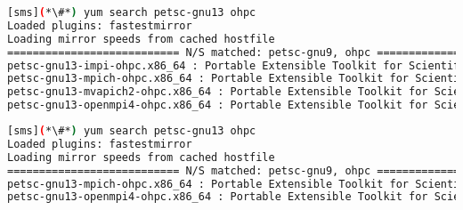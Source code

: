 \begin{lstlisting}[language=bash,keywords={}]
[sms](*\#*) yum search petsc-gnu13 ohpc
Loaded plugins: fastestmirror
Loading mirror speeds from cached hostfile
=========================== N/S matched: petsc-gnu9, ohpc ===========================
petsc-gnu13-impi-ohpc.x86_64 : Portable Extensible Toolkit for Scientific Computation
petsc-gnu13-mpich-ohpc.x86_64 : Portable Extensible Toolkit for Scientific Computation
petsc-gnu13-mvapich2-ohpc.x86_64 : Portable Extensible Toolkit for Scientific Computation
petsc-gnu13-openmpi4-ohpc.x86_64 : Portable Extensible Toolkit for Scientific Computation
\end{lstlisting}
\fi

\begin{lstlisting}[language=bash,keywords={}]
[sms](*\#*) yum search petsc-gnu13 ohpc
Loaded plugins: fastestmirror
Loading mirror speeds from cached hostfile
=========================== N/S matched: petsc-gnu9, ohpc ===========================
petsc-gnu13-mpich-ohpc.x86_64 : Portable Extensible Toolkit for Scientific Computation
petsc-gnu13-openmpi4-ohpc.x86_64 : Portable Extensible Toolkit for Scientific Computation
\end{lstlisting}
\fi

